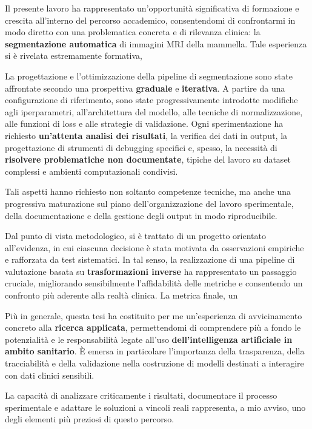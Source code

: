 Il presente lavoro ha rappresentato un'opportunità significativa di formazione e crescita all’interno del percorso accademico, consentendomi di confrontarmi in modo diretto con una problematica concreta e di rilevanza clinica: la \textbf{segmentazione automatica} di immagini MRI della mammella. Tale esperienza si è rivelata estremamente formativa, 

La progettazione e l’ottimizzazione della pipeline di segmentazione sono state affrontate secondo una prospettiva \textbf{graduale} e \textbf{iterativa}. A partire da una configurazione di riferimento, sono state progressivamente introdotte modifiche agli iperparametri, all’architettura del modello, alle tecniche di normalizzazione, alle funzioni di loss e alle strategie di validazione. Ogni sperimentazione ha richiesto \textbf{un’attenta analisi dei risultati}, la verifica dei dati in output, la progettazione di strumenti di debugging specifici e, spesso, la necessità di \textbf{risolvere problematiche non documentate}, tipiche del lavoro su dataset complessi e ambienti computazionali condivisi.

Tali aspetti hanno richiesto non soltanto competenze tecniche, ma anche una progressiva maturazione sul piano dell’organizzazione del lavoro sperimentale, della documentazione e della gestione degli output in modo riproducibile.

Dal punto di vista metodologico, si è trattato di un progetto orientato all’evidenza, in cui ciascuna decisione è stata motivata da osservazioni empiriche e rafforzata da test sistematici. In tal senso, la realizzazione di una pipeline di valutazione basata su \textbf{trasformazioni inverse} ha rappresentato un passaggio cruciale, migliorando sensibilmente l’affidabilità delle metriche e consentendo un confronto più aderente alla realtà clinica. La metrica finale, un 

Più in generale, questa tesi ha costituito per me un’esperienza di avvicinamento concreto alla \textbf{ricerca applicata}, permettendomi di comprendere più a fondo le potenzialità e le responsabilità legate all’uso \textbf{dell’intelligenza artificiale in ambito sanitario}. È emersa in particolare l’importanza della trasparenza, della tracciabilità e della validazione nella costruzione di modelli destinati a interagire con dati clinici sensibili.

 La capacità di analizzare criticamente i risultati, documentare il processo sperimentale e adattare le soluzioni a vincoli reali rappresenta, a mio avviso, uno degli elementi più preziosi di questo percorso.
